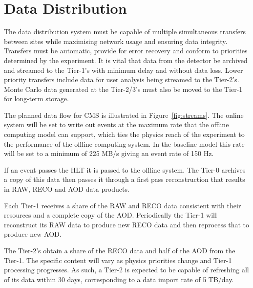\section{Data Distribution}
The data distribution system must be capable of multiple simultaneous transfers between sites while maximising network usage and ensuring data integrity. Transfers must be automatic, provide for error recovery and conform to priorities determined by the experiment. It is vital that data from the detector be archived and streamed to the Tier-1's with minimum delay and without data loss. Lower priority transfers include data for user analysis being streamed to the Tier-2's. Monte Carlo data generated at the Tier-2/3's must also be moved to the Tier-1 for long-term storage.

The planned data flow for CMS is illustrated in Figure~\ref{fig:streams}. The online system will be set to write out events at the maximum rate that the offline computing model can support, which ties the physics reach of the experiment to the performance of the offline computing system. In the baseline model this rate will be set to a minimum of 225 MB/s giving an event rate of 150 Hz.

If an event passes the HLT it is passed to the offline system. The Tier-0 archives a copy of this data then passes it through a first pass reconstruction that results in RAW, RECO and AOD data products. 

Each Tier-1 receives a share of the RAW and RECO data consistent with their resources and a complete copy of the AOD. Periodically the Tier-1 will reconstruct its RAW data to produce new RECO data and then reprocess that to produce new AOD.

The Tier-2's obtain a share of the RECO data and half of the AOD from the Tier-1. The specific content will vary as physics priorities change and Tier-1 processing progresses. As such, a Tier-2 is expected to be capable of refreshing all of its data within 30 days, corresponding to a data import rate of 5 TB/day.



